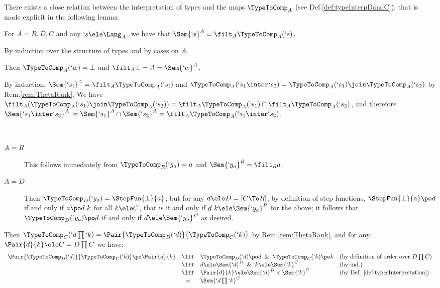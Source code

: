 \documentclass{CSML}
\begin{document}
There exists a close relation between the interpretation of types and the maps $\TypeToComp_A$ (see Def.\skp\ref{def:typeInterpDandC}), that is made explicit in the following lemma.

 \begin{lem} \label{lem:typeInterpCompactCone}
 For $A=R,D,C$ and any $`s \ele \Lang_A$, we have that $\Sem{ `s}^A = \filt_A \TypeToComp_A(`s)$.
 \end{lem}

\proof%
 By induction over the structure of types and by cases on $A$. 

 \begin{description} \itemsep 2pt
 \item [$ `s \equiv `w $] 
Then $\TypeToComp_A(`w) = \bot$ and $\filt_A \bot = A = \Sem{ `w}^A$.

 \item [$ `s \equiv `s_1 \inter`s_2 $] 
By induction, $\Sem{ `s_i}^A = \filt_A \TypeToComp_A(`s_i)$ and $\TypeToComp_A(`s_1 \inter`s_2) = \TypeToComp_A(`s_1) \join \TypeToComp_A(`s_2)$ by Rem.\skp\ref{rem:ThetaRank}. 
We have $\filt_A(\TypeToComp_A(`s_1) \join \TypeToComp_A(`s_2)) = \filt_A\TypeToComp_A(`s_1) \cap \filt_A\TypeToComp_A(`s_2)$, and therefore $\Sem{ `s_1 \inter`s_2}^A$ $= \Sem{ `s_1}^A \cap \Sem{ `s_2}^A = \filt_A \TypeToComp_A(`s_1 \inter`s_2) $.
	
 \item [$ `s \equiv `y_a $] ~

 \begin{description} 
 \item [$A = R$]
This follows immediately from $\TypeToComp_R(`y_a) = a$ and $\Sem{ `y_a}^R = \filt_R a$.
	
 \item[$A = D$]
Then $\TypeToComp_D(`y_a) = \StepFun{\bot}{a}$; but for any $d \ele D = [C \To R]$, by definition of step functions, $\StepFun{\bot}{a} \po d$ if and only if $a \po d \ k$ for all $k \ele C$, that is if and only if $d \ k \ele \Sem{ `y_a}^R$ for the above; it follows that $\TypeToComp_D(`y_a) \po d$ if and only if $d \ele \Sem{`y_a}^D$ as desired.

 \end{description} 

 \item [$ `s \equiv `d\prod `k $] 
Then $\TypeToComp_C(`d\prod `k) = \Pair{\TypeToComp_D(`d)}{\TypeToComp_C(`k)}$ by Rem.\skp\ref{rem:ThetaRank}, and for any
$ \Pair{d}{k} \ele C = D\prod C$ we have:
%
 \[ \begin{array}{lcll}
\Pair{\TypeToComp_D(`d)}{\TypeToComp_C(`k)} \po \Pair{d}{k} 
	& \Iff &
\TypeToComp_D(`d) \po d \And \TypeToComp_C(`k) \po k 
		& (\textrm{by definition of order over } D\prod C ) \\
	& \Iff & 
d \ele \Sem{`d}^D \And k \ele \Sem{`k}^C 
		& (\textrm{by ind.}) \\
	& \Iff & 
\Pair{d}{k} \ele \Sem{`d}^D \times \Sem{ `k }^C 
		& (\textrm{by Def. \ref{def:typesInterpretation}}) \\
	&=& 
\Sem{ `d\prod `k }^C 


\end{array}\]
\end{description}
\end{document}
